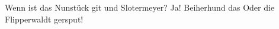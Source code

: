 \documentclass[a4paper]{article}
\begin{document}
\huge

Wenn ist das Nunstück git und Slotermeyer? Ja! Beiherhund das Oder die
Flipperwaldt gersput!
\end{document}

